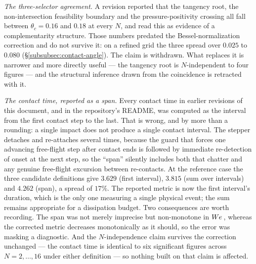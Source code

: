 \emph{The three-selector agreement.} A revision reported that the tangency root, the non-intersection feasibility boundary and the pressure-positivity crossing all fall between $\theta_c=0.16$ and $0.18$ at every $N$, and read this as evidence of a complementarity structure. Those numbers predated the Bessel-normalization correction and do not survive it: on a refined grid the three spread over $0.025$ to $0.080$ (\S\ref{subsubsec:contact-angle}). The claim is withdrawn. What replaces it is narrower and more directly useful --- the tangency root is $N$-independent to four figures --- and the structural inference drawn from the coincidence is retracted with it.

\emph{The contact time, reported as a span.} Every contact time in earlier revisions of this document, and in the repository's README, was computed as the interval from the first contact step to the last. That is wrong, and by more than a rounding: a single impact does not produce a single contact interval. The stepper detaches and re-attaches several times, because the guard that forces one advancing free-flight step after contact ends is followed by immediate re-detection of onset at the next step, so the ``span'' silently includes both that chatter and any genuine free-flight excursion between re-contacts. At the reference case the three candidate definitions give $3.629$ (first interval), $3.815$ (sum over intervals) and $4.262$ (span), a spread of $17\%$. The reported metric is now the first interval's duration, which is the only one measuring a single physical event; the sum remains appropriate for a dissipation budget. Two consequences are worth recording. The span was not merely imprecise but non-monotone in $W\kern-0.03em e\,$, whereas the corrected metric decreases monotonically as it should, so the error was masking a diagnostic. And the $N$-independence claim survives the correction unchanged --- the contact time is identical to six significant figures across $N=2,\dots,16$ under either definition --- so nothing built on that claim is affected.

